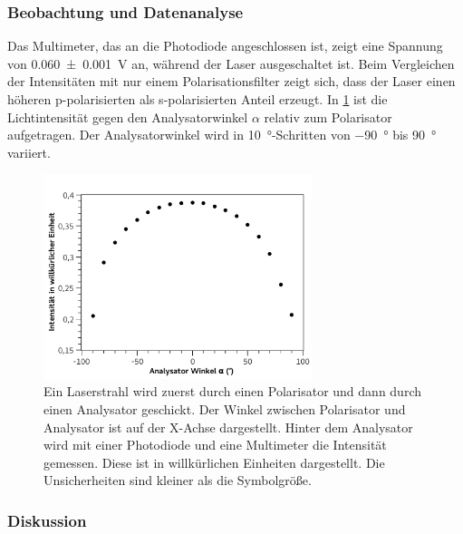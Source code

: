 \documentclass[
	a4paper,
	12pt,
	pagesize,
	ngerman
]{scrartcl}
\begin{document}
	\subsubsection{Beobachtung und Datenanalyse}
	Das Multimeter, das an die Photodiode angeschlossen ist, zeigt eine Spannung von \SI{0,060+-0,001}{V} an, während der Laser ausgeschaltet ist.
	Beim Vergleichen der Intensitäten mit nur einem Polarisationsfilter zeigt sich, dass der Laser einen höheren p-polarisierten als s-polarisierten Anteil erzeugt.
	In \cref{fig_Malus1} ist die Lichtintensität gegen den Analysatorwinkel $\alpha$ relativ zum Polarisator aufgetragen.
	Der Analysatorwinkel wird in \SI{10}{\degree}-Schritten von \SI{-90}{\degree} bis \SI{90}{\degree} variiert.

	\begin{figure}[H]
		\includegraphics[width=0.7\textwidth]{fig_Malus1}
		\centering
		\caption{Ein Laserstrahl wird zuerst durch einen Polarisator und dann durch einen Analysator geschickt. 
		Der Winkel zwischen Polarisator und Analysator ist auf der X-Achse dargestellt. 
		Hinter dem Analysator wird mit einer Photodiode und eine Multimeter die Intensität gemessen. 
		Diese ist in willkürlichen Einheiten dargestellt. 
		Die Unsicherheiten sind kleiner als die Symbolgröße.} 
		\label{fig_Malus1}
		\centering
	\end{figure}

	\subsubsection{Diskussion}
	
\end{document}
